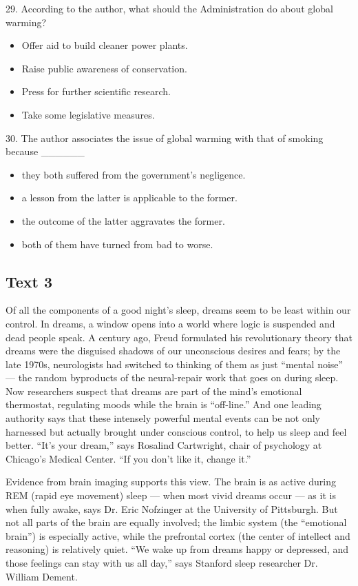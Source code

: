 \documentclass[UTF8,11pt]{ctexart}
\begin{document}
29. According to the author, what should the Administration do about global warming?


\begin{itemize}[leftmargin=2em,itemsep=.2em,topsep=.4em]\item[A.] Offer aid to build cleaner power plants.
\item[B.] Raise public awareness of conservation.
\item[C.] Press for further scientific research.
\item[D.] Take some legislative measures.
\end{itemize}

30. The author associates the issue of global warming with that of smoking because \_\_\_\_\_\_


\begin{itemize}[leftmargin=2em,itemsep=.2em,topsep=.4em]\item[A.] they both suffered from the government’s negligence.
\item[B.] a lesson from the latter is applicable to the former.
\item[C.] the outcome of the latter aggravates the former.
\item[D.] both of them have turned from bad to worse.
\end{itemize}

\subsection*{\textbf{Text 3}}


Of all the components of a good night’s sleep, dreams seem to be least within our control. In dreams, a window opens into a world where logic is suspended and dead people speak. A century ago, Freud formulated his revolutionary theory that dreams were the disguised shadows of our unconscious desires and fears; by the late 1970s, neurologists had switched to thinking of them as just “mental noise” — the random byproducts of the neural-repair work that goes on during sleep. Now researchers suspect that dreams are part of the mind’s emotional thermostat, regulating moods while the brain is “off-line.” And one leading authority says that these intensely powerful mental events can be not only harnessed but actually brought under conscious control, to help us sleep and feel better. “It’s your dream,” says Rosalind Cartwright, chair of psychology at Chicago’s Medical Center. “If you don’t like it, change it.”


Evidence from brain imaging supports this view. The brain is as active during REM (rapid eye movement) sleep — when most vivid dreams occur — as it is when fully awake, says Dr. Eric Nofzinger at the University of Pittsburgh. But not all parts of the brain are equally involved; the limbic system (the “emotional brain”) is especially active, while the prefrontal cortex (the center of intellect and reasoning) is relatively quiet. “We wake up from dreams happy or depressed, and those feelings can stay with us all day,” says Stanford sleep researcher Dr. William Dement.
\end{document}

